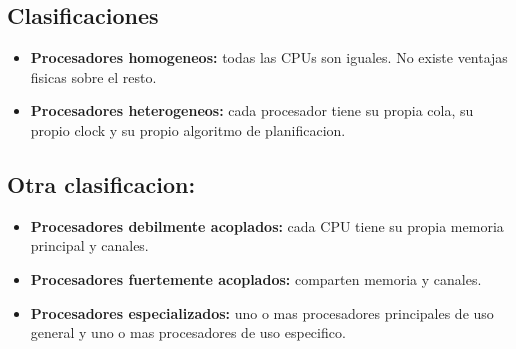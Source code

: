 \documentclass[11pt]{article}
\begin{document}
\subsection{Clasificaciones}
\begin{itemize}
    \item \textbf{Procesadores homogeneos:} todas las CPUs son iguales. No existe ventajas fisicas sobre el resto.
    \item \textbf{Procesadores heterogeneos:} cada procesador tiene su propia cola, su propio clock y su propio algoritmo de planificacion.
\end{itemize}

\subsection{Otra clasificacion:}
\begin{itemize}
    \item \textbf{Procesadores debilmente acoplados:} cada CPU tiene su propia memoria principal y canales.
    \item \textbf{Procesadores fuertemente acoplados:} comparten memoria y canales.
    \item \textbf{Procesadores especializados:} uno o mas procesadores principales de uso general y uno o mas procesadores de uso especifico.
\end{itemize}
\end{document}
